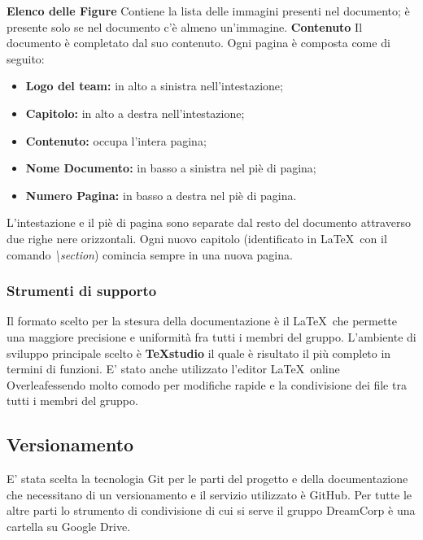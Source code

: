 		\newline \newline \textbf{Elenco delle Figure} Contiene la lista delle immagini presenti nel documento; è presente solo se nel documento c'è almeno un'immagine.
		\newline \newline \textbf{Contenuto}  Il documento è completato dal suo contenuto. Ogni pagina è composta come di seguito:\newline
		\begin{itemize}
			\item \textbf{Logo del team:} in alto a sinistra nell'intestazione;
			\item \textbf{Capitolo:} in alto a destra nell'intestazione;
			\item \textbf{Contenuto:} occupa l'intera pagina;
			\item \textbf{Nome Documento:} in basso a sinistra nel piè di pagina;
			\item \textbf{Numero Pagina:} in basso a destra nel piè di pagina. \newline
		\end{itemize}
		L'intestazione e il piè di pagina sono separate dal resto del documento attraverso due righe nere orizzontali. Ogni nuovo capitolo (identificato in \LaTeX ~con il comando \textit{\textbackslash{}section}) comincia sempre in una nuova pagina.
		\subsubsection{Strumenti di supporto}
		\label{3.1.8}
			Il formato scelto per la stesura della documentazione è il  \LaTeX\pedice ~che permette una maggiore precisione e uniformità fra tutti i membri del gruppo. L'ambiente di sviluppo principale scelto è \textbf{TeXstudio\pedice} il quale è risultato il più completo in termini di funzioni.
			E' stato anche utilizzato l'editor \LaTeX ~online Overleaf\pedice essendo molto comodo per modifiche rapide e la condivisione dei file tra tutti i membri del gruppo.
	\subsection{Versionamento}
		E' stata scelta la tecnologia Git per le parti del progetto e della documentazione che necessitano di un versionamento e il servizio utilizzato è GitHub. Per tutte le altre parti lo strumento di condivisione di cui si serve il gruppo DreamCorp è una cartella su Google Drive\pedice.
